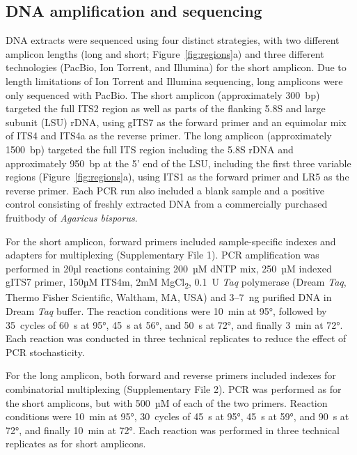 \documentclass[
  12pt,
]{article}
\begin{document}
\hypertarget{dna-amplification-and-sequencing}{%
\subsection{DNA amplification and sequencing}\label{dna-amplification-and-sequencing}}

DNA extracts were sequenced using four distinct strategies, with two different amplicon lengths (long and short; Figure~\ref{fig:regions}a) and three different technologies (PacBio, Ion Torrent, and Illumina) for the short amplicon.
Due to length limitations of Ion Torrent and Illumina sequencing, long amplicons were only sequenced with PacBio.
The short amplicon (approximately 300~bp) targeted the full ITS2 region as well as parts of the flanking 5.8S and large subunit (LSU) rDNA, using gITS7 \autocite{ihrmark2012} as the forward primer and an equimolar mix of ITS4 \autocite{white1990amplification} and ITS4a \autocite{urbina2016} as the reverse primer.
The long amplicon (approximately 1500~bp) targeted the full ITS region including the 5.8S rDNA and approximately 950~bp at the 5' end of the LSU, including the first three variable regions (Figure~\ref{fig:regions}a), using ITS1 \autocite{white1990amplification} as the forward primer and LR5 \autocite{vilgalys1990} as the reverse primer.
Each PCR run also included a blank sample and a positive control consisting of freshly extracted DNA from a commercially purchased fruitbody of \emph{Agaricus bisporus}.

For the short amplicon, forward primers included sample-specific indexes and adapters for multiplexing (Supplementary File 1).
PCR amplification was performed in 20µl reactions containing 200~µM dNTP mix, 250~µM indexed gITS7 primer,
150µM ITS4m, 2mM MgCl\textsubscript{2}, 0.1~U \emph{Taq} polymerase (Dream \emph{Taq}, Thermo Fisher Scientific, Waltham, MA, USA) and 3--7~ng purified DNA in Dream \emph{Taq} buffer.
The reaction conditions were 10~min at 95°, followed by 35~cycles of 60~s at 95°, 45~s at 56°, and 50~s at 72°, and finally 3~min at 72°.
Each reaction was conducted in three technical replicates to reduce the effect of PCR stochasticity.

For the long amplicon, both forward and reverse primers included indexes for combinatorial multiplexing (Supplementary File 2).
PCR was performed as for the short amplicons, but with 500~µM of each of the two primers.
Reaction conditions were 10~min at 95°, 30~cycles of 45~s at 95°, 45~s at 59°, and 90~s at 72°, and finally 10~min at 72°.
Each reaction was performed in three technical replicates as for short amplicons.
\end{document}

